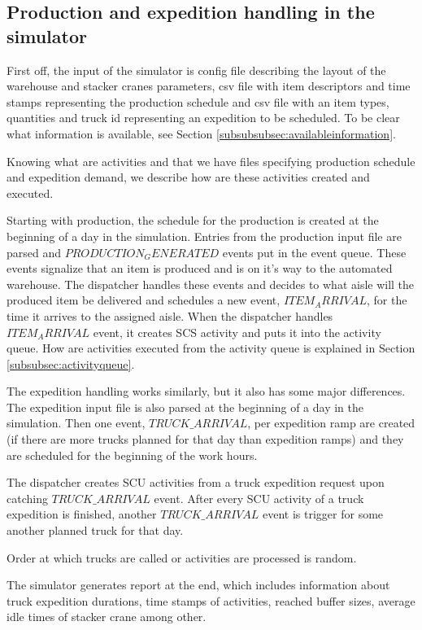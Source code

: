 \documentclass{ctuthesis}
\begin{document}
\subsection{Production and expedition handling in the simulator}

First off, the input of the simulator is config file describing the layout of the warehouse and stacker cranes parameters, csv file with item descriptors and time stamps representing the production schedule and csv file with an item types, quantities and truck id representing an expedition to be scheduled. To be clear what information is available, see Section \ref{subsubsubsec:availableinformation}.

Knowing what are activities and that we have files specifying production schedule and expedition demand, we describe how are these activities created and executed.

Starting with production, the schedule for the production is created at the beginning of a day in the simulation. Entries from the production input file are parsed and $PRODUCTION_GENERATED$ events put in the event queue. These events signalize that an item is produced and is on it's way to the automated warehouse. The dispatcher handles these events and decides to what aisle will the produced item be delivered and schedules a new event, $ITEM_ARRIVAL$, for the time it arrives to the assigned aisle. When the dispatcher handles $ITEM_ARRIVAL$ event, it creates SCS activity and puts it into the activity queue. How are activities executed from the activity queue is explained in Section \ref{subsubsec:activityqueue}.

The expedition handling works similarly, but it also has some major differences. The expedition input file is also parsed at the beginning of a day in the simulation. Then one event, $TRUCK\_ARRIVAL$, per expedition ramp are created (if there are more trucks planned for that day than expedition ramps) and they are scheduled for the beginning of the work hours. 

The dispatcher creates SCU activities from a truck expedition request upon catching $TRUCK\_ARRIVAL$ event. After every SCU activity of a truck expedition is finished, another $TRUCK\_ARRIVAL$ event is trigger for some another planned truck for that day.  

Order at which trucks are called or activities are processed is random.

The simulator generates report at the end, which includes information about truck expedition durations, time stamps of activities, reached buffer sizes, average idle times of stacker crane among other.
\end{document}
